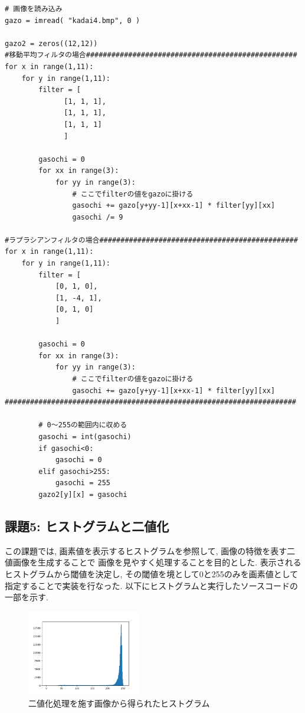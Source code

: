 \documentclass[a4paper,11pt,uplatex, titlepage]{jsarticle}
\begin{document}
\begin{lstlisting}[basicstyle=\ttfamily\footnotesize]
# 画像を読み込み
gazo = imread( "kadai4.bmp", 0 )

gazo2 = zeros((12,12))
#移動平均フィルタの場合##################################################
for x in range(1,11):
    for y in range(1,11):
        filter = [
              [1, 1, 1],　　
              [1, 1, 1],
              [1, 1, 1]
              ]

        gasochi = 0
        for xx in range(3):
            for yy in range(3):
                # ここでfilterの値をgazoに掛ける
                gasochi += gazo[y+yy-1][x+xx-1] * filter[yy][xx]
                gasochi /= 9

#ラプラシアンフィルタの場合###############################################
for x in range(1,11):
    for y in range(1,11):
        filter = [
            [0, 1, 0],　　
            [1, -4, 1],
            [0, 1, 0]
            ]

        gasochi = 0
        for xx in range(3):
            for yy in range(3):
                # ここでfilterの値をgazoに掛ける
                gasochi += gazo[y+yy-1][x+xx-1] * filter[yy][xx]
#####################################################################

        # 0〜255の範囲内に収める
        gasochi = int(gasochi)
        if gasochi<0:
            gasochi = 0
        elif gasochi>255:
            gasochi = 255
        gazo2[y][x] = gasochi
\end{lstlisting}

\subsection{課題5: ヒストグラムと二値化}
この課題では, 画素値を表示するヒストグラムを参照して, 画像の特徴を表す二値画像を生成することで
画像を見やすく処理することを目的とした.
表示されるヒストグラムから閾値を決定し, その閾値を境として0と255のみを画素値として指定することで実装を行なった.
以下にヒストグラムと実行したソースコードの一部を示す.

\begin{figure}[H]
  \begin{center}
    \includegraphics[width = 5cm]{pic/kadai5_graph1.png}
    \caption{二値化処理を施す画像から得られたヒストグラム}
    \label{5_hist}
  \end{center}
\end{figure}
\end{document}
